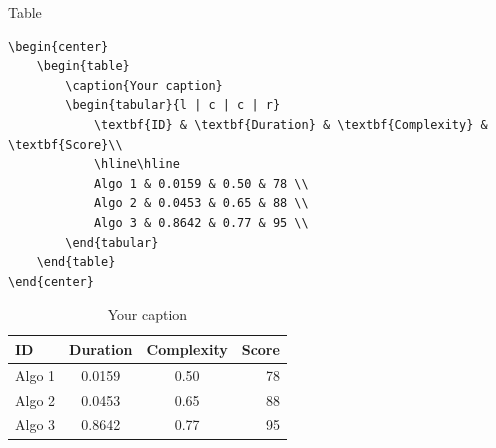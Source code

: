 \documentclass[aspectratio=1610]{beamer}
\begin{document}

\begin{frame}[fragile]{Table}
    \lstset{language=[LaTeX]TeX}
\begin{lstlisting}
\begin{center}
    \begin{table}
        \caption{Your caption}
        \begin{tabular}{l | c | c | r}
            \textbf{ID} & \textbf{Duration} & \textbf{Complexity} & \textbf{Score}\\
            \hline\hline
            Algo 1 & 0.0159 & 0.50 & 78 \\
            Algo 2 & 0.0453 & 0.65 & 88 \\
            Algo 3 & 0.8642 & 0.77 & 95 \\
        \end{tabular}
    \end{table}
\end{center}
\end{lstlisting}
    \begin{center}
        \begin{table}
            \caption{Your caption}
            \begin{tabular}{l | c | c | r}
                \textbf{ID} & \textbf{Duration} & \textbf{Complexity} & \textbf{Score}\\
                \hline\hline
                Algo 1 & 0.0159 & 0.50 & 78 \\
                Algo 2 & 0.0453 & 0.65 & 88 \\
                Algo 3 & 0.8642 & 0.77 & 95 \\
            \end{tabular}
        \end{table}
    \end{center}
    \note{~}
\end{frame}

\end{document}
